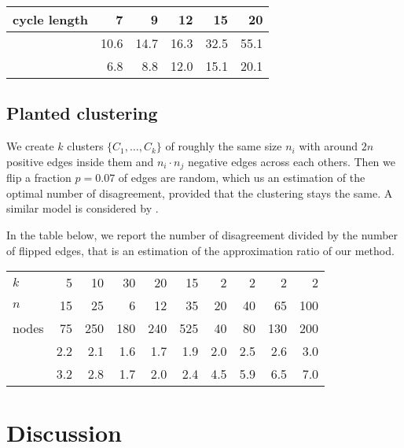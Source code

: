 \begin{center}
\begin{tabular}{lrrrrr}
\toprule
cycle length &   7  &   9  &   12 &   15 &   20 \\
\midrule
\pot{} & 10.6 & 14.7 & 16.3 & 32.5 & 55.1 \\
\pat{} &  6.8 &  8.8 & 12.0 & 15.1 & 20.1 \\
\bottomrule
\end{tabular}
\end{center}

\subsection{Planted clustering}

We create $k$ clusters $\{C_1, \ldots, C_k\}$ of roughly the same size $n_i$
with around $2n$ positive edges inside them and $n_i\cdot n_j$ negative edges
across each others. Then we flip a fraction $p=0.07$ of edges are random,
which us an estimation of the optimal number of disagreement, provided that
the clustering stays the same. A similar model is considered by
\textcite{Makarychev2014}.

In the table below, we report the number of disagreement divided by the
number of flipped edges, that is an estimation of the approximation ratio of
our method.

\begin{center}
\begin{tabular}{lrrrrrrrrr}
\toprule
$k$      & 5   & 10  & 30  & 20  & 15  & 2   & 2   & 2   & 2  \\
$n$      & 15  & 25  & 6   & 12  & 35  & 20  & 40  & 65  & 100 \\
nodes    & 75  & 250 & 180 & 240 & 525 & 40  & 80  & 130 & 200 \\
\midrule
\pat{}   & 2.2 & 2.1 & 1.6 & 1.7 & 1.9 & 2.0 & 2.5 & 2.6 & 3.0 \\
\pot{}   & 3.2 & 2.8 & 1.7 & 2.0 & 2.4 & 4.5 & 5.9 & 6.5 & 7.0 \\
\bottomrule
\end{tabular}
\end{center}

\section{Discussion}

